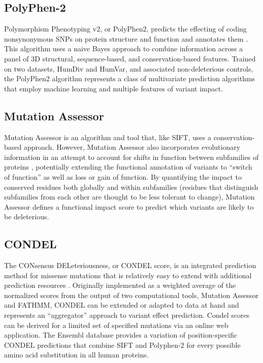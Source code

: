 \documentclass{article}
\begin{document}
\subsection{PolyPhen-2}

Polymorphism Phenotyping v2, or PolyPhen2, predicts the effecting of
coding nonsynonymous SNPs on protein structure and function and
annotates them \parencite{Adzhubei2013-nj}. This algorithm uses a naive
Bayes approach to combine information across a panel of 3D structural,
sequence-based, and conservation-based features. Trained on two
datasets, HumDiv and HumVar, and associated non-deleterious controls,
the PolyPhen2 algorithm represents a class of multivariate prediction
algorithms that employ machine learning and multiple features of
variant impact. 

\subsection{Mutation Assessor}

Mutation Assessor is an algorithm and tool that, like SIFT, uses a
conservation-based approach. However, Mutation Assessor also
incorporates evolutionary information in an attempt to account for
shifts in function between subfamilies of proteins \parencite{Reva2011-en},
potentially extending the functional annotation of variants to
``switch of function'' as well as loss or gain of function. By
quantifying the impact to conserved residues both globally and within
subfamilies (residues that distinguish subfamilies from each other are
thought to be less tolerant to change), Mutation Assessor defines a
functional impact score to predict which variants are likely to be
deleterious.

\subsection{CONDEL}

The CONsensus DELeteriousness, or CONDEL score, is an integrated
prediction method for missense mutations that is relatively easy to
extend with additional prediction resources
\parencite{Gonzalez-Perez2011-gc}. Originally implemented as a weighted
average of the normalized scores from the output of two computational
tools, Mutation Assessor and FATHMM, CONDEL can be extended or adapted
to data at hand and represents an ``aggregator'' approach to variant
effect prediction.  Condel scores can be derived for a limited set of
specified mutations via an online web application. The Ensembl
database provides a variation of position-specific CONDEL predictions
that combine SIFT and Polyphen-2 for every possible amino acid
substitution in all human proteins.
\end{document}

